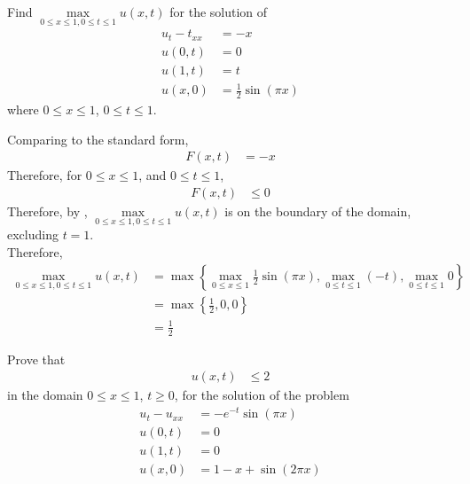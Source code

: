 \documentclass[titlepage, fleqn, a4paper, 12pt, twoside]{article}
\theoremstyle{definition}
\theoremstyle{theorem}
\begin{document}
\begin{question}
	Find $\max\limits_{0 \le x \le 1 , 0 \le t \le 1} u(x,t)$ for the solution of
	\begin{align*}
		u_t - t_{x x} & = -x \\
		u(0,t)        & = 0  \\
		u(1,t)        & = t  \\
		u(x,0)        & = \frac{1}{2} \sin(\pi x)
	\end{align*}
	where $0 \le x \le 1$, $0 \le t \le 1$.
\end{question}

\begin{solution}
	Comparing to the standard form,
	\begin{align*}
		F(x,t) & = -x
	\end{align*}
	Therefore, for $0 \le x \le 1$, and $0 \le t \le 1$,
	\begin{align*}
		F(x,t) & \le 0
	\end{align*}
	Therefore, by , $\max\limits_{0 \le x \le 1 , 0 \le t \le 1} u(x,t)$ is on the boundary of the domain, excluding $t = 1$.\\
	Therefore,
	\begin{align*}
		\max\limits_{0 \le x \le 1 , 0 \le t \le 1} u(x,t) & = \max\left\{ \max\limits_{0 \le x \le 1} \frac{1}{2} \sin(\pi x) , \max\limits_{0 \le t \le 1} (-t) , \max\limits_{0 \le t \le 1} 0 \right\} \\
                                                                   & = \max\left\{ \frac{1}{2} , 0 , 0 \right\}                                                                                                    \\
                                                                   & = \frac{1}{2}
	\end{align*}
\end{solution}

\begin{question}
	Prove that
	\begin{align*}
		u(x,t) & \le 2
	\end{align*}
	in the domain $0 \le x \le 1$, $t \ge 0$, for the solution of the problem
	\begin{align*}
		u_t - u_{x x} & = -e^{-t} \sin(\pi x) \\
		u(0,t)        & = 0                   \\
		u(1,t)        & = 0                   \\
		u(x,0)        & = 1 - x + \sin(2 \pi x)
	\end{align*}
\end{question}
\end{document}
